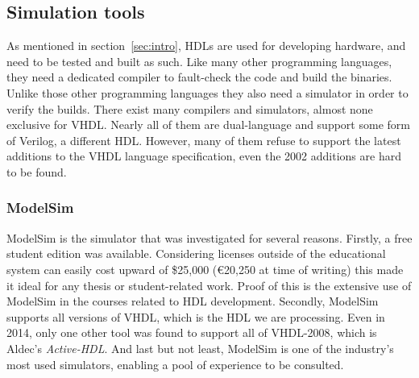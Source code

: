 \documentclass[11pt,british]{article}
\begin{document}

\subsection{Simulation tools}
\label{subsec:simtool}
As mentioned in section~\ref{sec:intro}, \gls{HDL}s are used for developing hardware, and need to be tested and built as such. Like many other programming languages, they need a dedicated compiler to fault-check the code and build the binaries. Unlike those other programming languages they also need a simulator in order to verify the builds. There exist many compilers and simulators, almost none exclusive for \gls{VHDL}. Nearly all of them are dual-language and support some form of Verilog, a different HDL. However, many of them refuse to support the latest additions to the VHDL language specification, even the 2002 additions are hard to be found.\cite{ActiveHDL,Cadence,ISE,Quartus}

\subsubsection{ModelSim}
ModelSim is the simulator that was investigated for several reasons. Firstly, a free student edition was available. Considering licenses  outside of the educational system can easily cost upward of \$25,000 (\euro20,250 at time of writing) this made it ideal for any thesis or student-related work. Proof of this is the extensive use of ModelSim in the courses related to HDL development. Secondly, ModelSim supports all versions of \gls{VHDL}, which is the \gls{HDL} we are processing. Even in 2014, only one other tool was found to support all of VHDL-2008, which is Aldec's \emph{Active-HDL}. And last but not least, ModelSim is one of the industry's most used simulators, enabling a pool of experience to be consulted.\cite{ModelSim}

\end{document}
